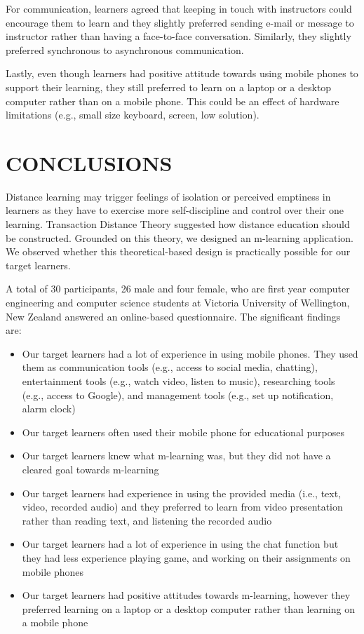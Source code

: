 \documentclass[a4paper,twoside]{article}
\begin{document}
For communication, learners agreed that keeping in touch with instructors could encourage them to learn and they slightly preferred sending e-mail or message to instructor rather than having a face-to-face conversation. Similarly, they slightly preferred synchronous to asynchronous communication. 

Lastly, even though learners had positive attitude towards using mobile phones to support their learning, they still preferred to learn on a laptop or a desktop computer rather than on a mobile phone. This could be an effect of hardware limitations (e.g., small size keyboard, screen, low solution). 


\section{CONCLUSIONS} 
\noindent Distance learning may trigger feelings of isolation or perceived emptiness in learners as they have to exercise more self-discipline and control over their one learning. Transaction Distance Theory suggested how distance education should be constructed. Grounded on this theory, we designed an m-learning application. We observed whether this theoretical-based design is practically possible for our target learners. 

A total of 30 participants, 26 male and four female, who are first year computer engineering and computer science students at Victoria University of Wellington, New Zealand answered an online-based questionnaire. The significant findings are: 
\begin{itemize} 
\item{Our target learners had a lot of experience in using mobile phones. They used them as communication tools (e.g., access to social media, chatting), entertainment tools (e.g., watch video, listen to music), researching tools (e.g., access to Google), and management tools (e.g., set up notification, alarm clock)} 
\item {Our target learners often used their mobile phone for educational purposes}
\item {Our target learners knew what m-learning was, but they did not have a cleared goal towards m-learning} 
\item {Our target learners had experience in using the provided media (i.e., text, video, recorded audio) and they preferred to learn from video presentation rather than reading text, and listening the recorded audio} 
\item{Our target learners had a lot of experience in using the chat function but they had less experience playing game, and working on their assignments on mobile phones} 
\item {Our target learners had positive attitudes towards m-learning, however they preferred learning on a laptop or a desktop computer rather than learning on a mobile phone}
\end{itemize} 
\end{document}
